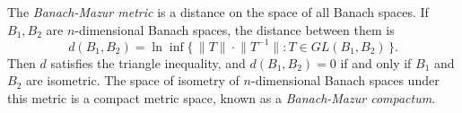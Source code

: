 \documentclass[12pt]{article}
\newcommand*{\norm}[1]{\lVert #1\rVert}
\begin{document}

The \emph{Banach-Mazur metric} is a distance on the space of all
 Banach spaces. If $B_1,B_2$ are $n$-dimensional Banach
spaces, the distance between them is
\begin{equation*}
d(B_1,B_2)=\ln\inf \{\,\norm{T}\cdot\norm{T^{-1}} : T\in
GL(B_1,B_2)\,\}.
\end{equation*}
Then $d$ satisfies the triangle inequality, and $d(B_1,B_2)=0$ if
and only if $B_1$ and $B_2$ are isometric. The space of isometry
 of $n$-dimensional Banach spaces under this metric is a compact metric space, known as a \emph{Banach-Mazur compactum}.
\end{document}
